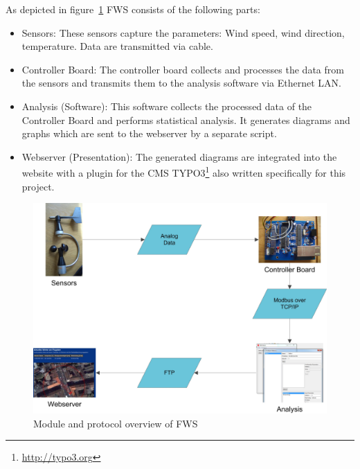 As depicted in figure~\ref{fig:fws_overview} FWS consists of the following parts:
\begin{itemize}
\item Sensors: These sensors capture the parameters: Wind speed, wind direction, temperature. Data are transmitted via cable.
\item Controller Board: The controller board collects and processes the data from the sensors and transmits them to the analysis software via Ethernet LAN.
\item Analysis (Software): This software collects the processed data of the Controller Board and performs statistical analysis. It generates diagrams and graphs which are sent to the webserver by a separate script.
\item Webserver (Presentation): The generated diagrams are integrated into the website with a plugin for the CMS TYPO3\footnote{\url{http://typo3.org}} also written specifically for this project.
\end{itemize}

\begin{figure}[ht]
    \centering
    \includegraphics[width=\linewidth]{graphics/overview.jpg}
    \caption{Module and protocol overview of FWS}
    \label{fig:fws_overview}
\end{figure}

